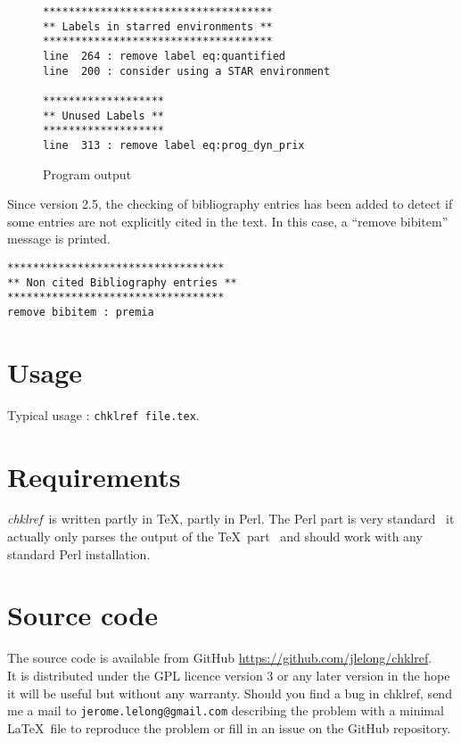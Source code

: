 \documentclass[a4paper,11pt,twoside]{article}
\def\chk{{\it chklref}}
\begin{document}
\begin{figure}[htbp]
  \centering
\begin{verbatim}
************************************
** Labels in starred environments **
************************************
line  264 : remove label eq:quantified
line  200 : consider using a STAR environment

*******************
** Unused Labels **
*******************
line  313 : remove label eq:prog_dyn_prix
\end{verbatim}
  \caption{Program output}
  \label{fig:output}
\end{figure}

Since version 2.5, the checking of bibliography entries has been added to
detect if some entries are not explicitly cited in the text. In this case, a
``remove bibitem'' message is printed.
\begin{verbatim}
**********************************
** Non cited Bibliography entries **
**********************************
remove bibitem : premia
\end{verbatim}


\section{Usage}

Typical usage : \verb!chklref file.tex!.
\\


\section{Requirements}

\chk\ is written partly in \TeX, partly in Perl. The Perl part is very
standard \textemdash\ it actually only parses the output of the \TeX\ part
\textemdash\ and should work with any standard Perl installation.


\section{Source code}

The source code is available from GitHub
\url{https://github.com/jlelong/chklref}.
\\

\noindent It is distributed under the GPL licence version 3 or any later version
in the hope it will be useful but without any warranty. Should you find a bug in
chklref, send me a mail to \verb!jerome.lelong@gmail.com! describing the problem
with a minimal \LaTeX\ file to reproduce the problem or fill in an issue on the
GitHub repository.
\end{document}
